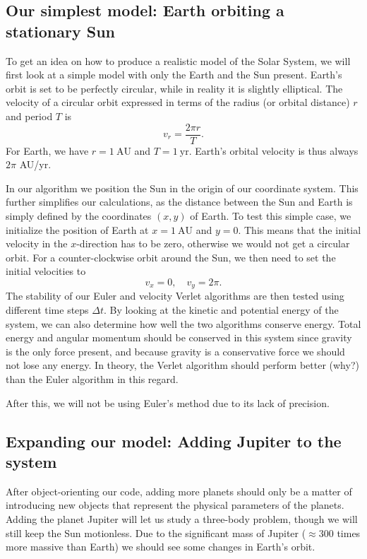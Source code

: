 \documentclass{emulateapj}
\begin{document}
\subsection{Our simplest model: Earth orbiting a stationary Sun}

To get an idea on how to produce a realistic model of the Solar System, we will first look at a simple model with only the Earth and the Sun present. Earth's orbit is set to be perfectly circular, while in reality it is slightly elliptical. The velocity of a circular orbit expressed in terms of the radius (or orbital distance) $r$ and period $T$ is
%
\begin{equation*}
    v_r = \frac{2\pi r}{T}.
\end{equation*}
%
For Earth, we have $r = 1 \ \textrm{AU}$ and $T = 1 \ \textrm{yr}$. Earth's orbital velocity is thus always $2\pi$ AU/yr.

In our algorithm we position the Sun in the origin of our coordinate system. This further simplifies our calculations, as the distance between the Sun and Earth is simply defined by the coordinates $(x, y)$ of Earth. To test this simple case, we initialize the position of Earth at $x = 1 \ \textrm{AU}$ and $y = 0$. This means that the initial velocity in the $x$-direction has to be zero, otherwise we would not get a circular orbit. For a counter-clockwise orbit around the Sun, we then need to set the initial velocities to
%
\begin{equation*}
    v_x = 0, \quad v_y = 2\pi.
\end{equation*}
%
The stability of our Euler and velocity Verlet algorithms are then tested using different time steps $\Delta t$. By looking at the kinetic and potential energy of the system, we can also determine how well the two algorithms conserve energy. Total energy and angular momentum should be conserved in this system since gravity is the only force present, and because gravity is a conservative force we should not lose any energy. In theory, the Verlet algorithm should perform better (why?) than the Euler algorithm in this regard.

After this, we will not be using Euler's method due to its lack of precision.

\subsection{Expanding our model: Adding Jupiter to the system}

After object-orienting our code, adding more planets should only be a matter of introducing new objects that represent the physical parameters of the planets. Adding the planet Jupiter will let us study a three-body problem, though we will still keep the Sun motionless. Due to the significant mass of Jupiter ($\approx 300$ times more massive than Earth) we should see some changes in Earth's orbit.
\end{document}
